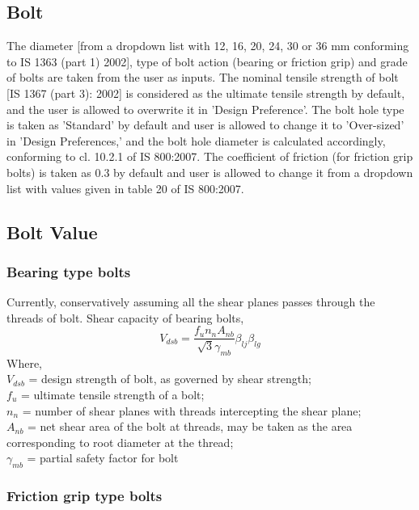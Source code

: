 \documentclass[11.5pt,a4paper,oneside]{report}
\begin{document}
\begin{Form}
\chapter{Bolt}
%
The diameter [from a dropdown list with 12, 16, 20, 24, 30 or 36 mm conforming to IS 1363 (part 1) 2002], type of bolt action (bearing or friction grip) and grade of bolts are taken from the user as inputs. The nominal tensile strength of bolt [IS 1367 (part 3): 2002] is considered as the ultimate tensile strength by default, and the user is allowed to overwrite it in 'Design Preference'. The bolt hole type is taken as 'Standard' by default and user is allowed to change it to 'Over-sized' in 'Design Preferences,' and the bolt hole diameter is calculated accordingly, conforming to cl. 10.2.1 of IS 800:2007. The coefficient of friction (for friction grip bolts) is taken as 0.3 by default and user is allowed to change it from a dropdown list with values given in table 20 of IS 800:2007. 
\section{Bolt Value}
\subsection{Bearing type bolts}
Currently, conservatively assuming all the shear planes passes through the threads of bolt. Shear capacity of bearing bolts,
\begin{equation}
	V_{dsb} = \frac{f_u n_n A_{nb}}{\sqrt{3} \gamma_{mb}} \beta_{lj} \beta_{lg} 
\end{equation}
Where, \\
\indent $V_{dsb}$ = design strength of bolt, as governed by shear strength;\\
\indent $f_u$ = ultimate tensile strength of a bolt;\\
\indent $n_n$ =  number of shear planes with threads intercepting the shear plane; \\
\indent $A_{nb}$ = net shear area of the bolt at threads, may be taken as the area corresponding to root diameter at the thread;\\
\indent $\gamma_{mb}$ = partial safety factor for bolt\\
\subsection{Friction grip type bolts}

\end{Form}
\end{document}

